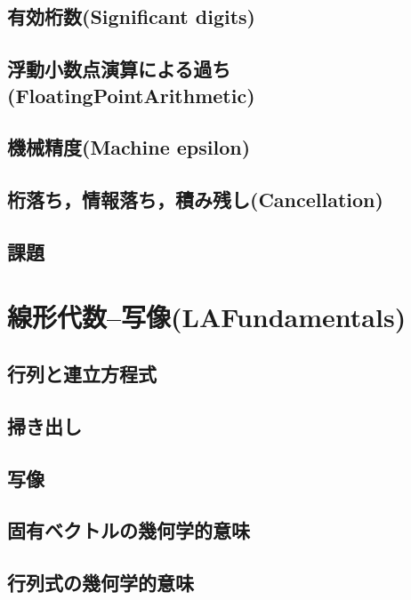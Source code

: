 \section{有効桁数(Significant digits)}
 
\section{浮動小数点演算による過ち(FloatingPointArithmetic)}
 
\section{機械精度(Machine epsilon)}
 
\section{桁落ち，情報落ち，積み残し(Cancellation)}
 
\section{課題}
 



\chapter{線形代数--写像(LAFundamentals)}
\section{行列と連立方程式}
 
\section{掃き出し}
 
\section{写像}
 
\section{固有ベクトルの幾何学的意味}
 
\section{行列式の幾何学的意味}
 
